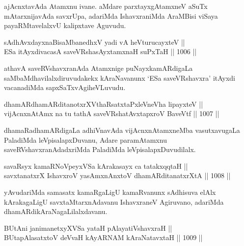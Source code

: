 \begin{artha}
ajAcnxtavAda Atamxnu ivane. aMdare parxtayxgAtamxneV aSuTx mAtarxnijavAda savxrUpa, adariMda IshavxraniMda AraMBisi viSaya payaRMtavelalxvU kalipxtave Aguvudu.
\end{artha}

\begin{shl}
sAdhAvxdayxnaBisaMbanedhxV yadi vA heVturucayxteV || \\
ESa itAyxdivacasA saveVRshasAyx\s \s tamxnaH suPxTaH \hfill || 1006 ||  
\end{shl}

\begin{artha}
athavA saveRVshavxranAda Atamxnige puNayxkamARdigaLa saMbaMdhavilalxdiruvudakekx kAraNavanunx `ESa saveVRshavxra' itAyxdi vacanadiMda sapxSaTxvAgiheVLuvudu.
\end{artha}


\begin{shl}
dhamARdhamARditanotxrXV\s thaRsatxtaPxleVneVha lipayxteV || \\
vijAcnxnAtAmx na tu tathA saveVRshatAvxtapxroV BaveVtf \hfill || 1007 ||  
\end{shl}

\begin{artha}
dhamaRadhamARdigaLa adhiVnavAda vijAcnxnAtamxneMba vasutx\break avugaLa PaladiMda leVpisalapxDuvanu, Adare paramAtamxnu saveRVshavxra\-\break nAdadxriMda PaladiMda leVpisalapxDuvudilalx.
\end{artha}

\begin{shl}
savaRsyx kamaRNoV\s peyxVSa kArakasayx ca tatakxqqtaH || \\
savxtanatxrX IshavxroV yasAmxnAnxtoV dhamARditanatxrXtA \hfill || 1008 ||  
\end{shl}

\begin{artha}
yAvudariMda samasatx kamaRgaLigU kamaRvanunx sAdhisuva elAlx kArakagaLigU savxtaMtarxnAdavanu IshavxraneV Agiruvano, adariMda dhamARdikAraNagaLilalxdavanu.
\end{artha}

\begin{shl}
BUtAni janimanetxyXVSa yataH pAlayatiVshavxraH || \\
BUtapAlasatxtoV deVvaH kAyARNAM kAraNatavxtaH \hfill || 1009 ||  
\end{shl}

